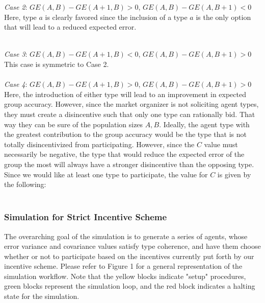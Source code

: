 \documentclass[twoside,twocolumn]{article}
\begin{document}
\textit{Case 2}: $GE(A,B) - GE(A+1,B)>0$, $GE(A,B) - GE(A,B+1)<0$\\

Here, type $a$ is clearly favored since the inclusion of a type $a$ is the only option that will lead to a reduced expected error. \\

\\
\newline

\textit{Case 3}: $GE(A,B) - GE(A+1,B)<0$, $GE(A,B) - GE(A,B+1)>0$\\

This case is symmetric to Case 2.\\

\\
\newline
\textit{Case 4}: $GE(A,B) - GE(A+1,B)>0$, $GE(A,B) - GE(A,B+1)>0$\\

Here, the introduction of either type will lead to an improvement in expected group accuracy. However, since the market organizer is not soliciting agent types, they must create a disincentive such that only one type can rationally bid. That way they can be sure of the population sizes $A,B$. Ideally, the agent type with the greatest contribution to the group accuracy would be the type that is not totally disincentivized from participating. However, since the $C$ value must necessarily be negative, the type that would reduce the expected error of the group the most will always have a stronger disincentive than the opposing type. Since we would like at least one type to participate, the value for $C$ is given by the following:\\

\\

\subsubsection{Simulation for Strict Incentive Scheme}

The overarching goal of the simulation is to generate a series of agents, whose error variance and covariance values satisfy type coherence, and have them choose whether or not to participate based on the incentives currently put forth by our incentive scheme. Please refer to Figure 1 for a general representation of the simulation workflow. Note that the yellow blocks indicate "setup" procedures, green blocks represent the simulation loop, and the red block indicates a halting state for the simulation.\\
\end{document}
